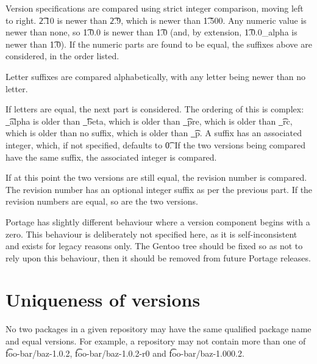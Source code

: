 Version specifications are compared using strict integer comparison, moving left to right. \t{2.10}
is newer than \t{2.9}, which is newer than \t{1.500}. Any numeric value is newer than none, so
\t{1.0.0} is newer than \t{1.0} (and, by extension, \t{1.0.0\_alpha} is newer than \t{1.0}).
If the numeric parts are found to be equal, the suffixes above are considered, in the order listed.

Letter suffixes are compared alphabetically, with any letter being newer than no letter.

If letters are equal, the next part is considered. The ordering of this is complex: \t{\_alpha} is
older than \t{\_beta}, which is older than \t{\_pre}, which is older than \t{\_rc}, which is older
than no suffix, which is older than \t{\_p}. A suffix has an associated integer, which, if not
specified, defaults to \t{0}. If the two versions being compared have the same suffix, the
associated integer is compared.

If at this point the two versions are still equal, the revision number is compared. The revision
number has an optional integer suffix as per the previous part. If the revision numbers are equal,
so are the two versions.

\note Portage has slightly different behaviour where a version component begins with a zero. This
    behaviour is deliberately not specified here, as it is self-inconsistent and exists for legacy
    reasons only. The Gentoo tree should be fixed so as not to rely upon this behaviour, then it
    should be removed from future Portage releases.

\section{Uniqueness of versions}

No two packages in a given repository may have the same qualified package name and equal versions.
For example, a repository may not contain more than one of \t{foo-bar/baz-1.0.2},
\t{foo-bar/baz-1.0.2-r0} and \t{foo-bar/baz-1.000.2}.


